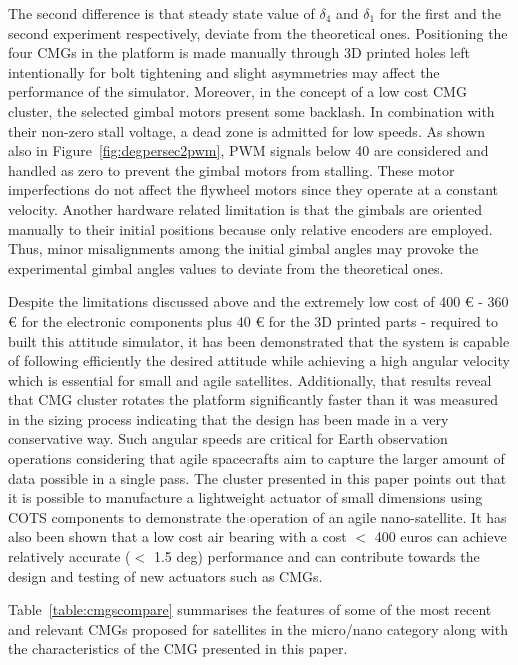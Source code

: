 \documentclass[aerospace,article,submit,moreauthors,dvi2pdf]{Definitions/mdpi}
\begin{document}
\begin{paracol}{2}
\linenumbers
\switchcolumn



The second difference is that steady state value of $\delta_4$ and $\delta_1$ for the first and the second experiment respectively, deviate from the theoretical ones. Positioning the four CMGs in the platform is made manually through 3D printed holes left intentionally for bolt tightening and slight asymmetries may affect the performance of the simulator. Moreover, in the concept of a low cost CMG cluster, the selected gimbal motors present some backlash. In combination with their non-zero stall voltage, a dead zone is admitted for low speeds. As shown also in Figure~\ref{fig:degpersec2pwm}, PWM signals below 40 are considered and handled as zero to prevent the gimbal motors from stalling. These motor imperfections do not affect the flywheel motors since they operate at a constant velocity. Another hardware related limitation is that the gimbals are oriented manually to their initial positions because only relative encoders are employed. Thus, minor misalignments among the initial gimbal angles may provoke the experimental gimbal angles values to deviate from the theoretical ones. 

Despite the limitations discussed above and the extremely low cost of 400 € - 360 € for the electronic components plus 40 € for the 3D printed parts - required to built this attitude simulator,  it has been demonstrated that the system is capable of following efficiently the desired attitude while achieving a high angular velocity which is essential for small and agile satellites. Additionally, that results reveal that CMG cluster rotates the platform significantly faster than it was measured in the sizing process indicating that the design has been made in a very conservative way.
Such angular speeds are critical for Earth observation operations considering that agile spacecrafts aim to capture the larger amount of data possible in a single pass. The cluster presented in this paper points out that it is possible to manufacture a lightweight actuator of small dimensions using COTS components to demonstrate the operation of an agile nano-satellite. It has also been shown that a low cost air bearing with a cost $<$ 400 euros can achieve relatively accurate ($<$ 1.5 deg) performance and can contribute towards the design and testing of new actuators such as CMGs.

Table~\ref{table:cmgscompare} summarises the features of some of the most recent and relevant CMGs proposed for satellites in the micro/nano category along with the characteristics of the CMG presented in this paper.

\end{paracol}
\nointerlineskip
\end{document}
